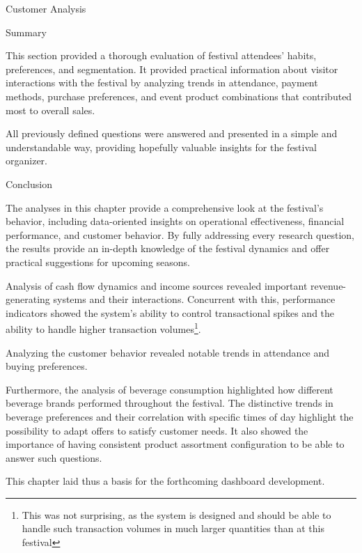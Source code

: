 \begin{section}{Customer Analysis}
	\begin{subsection}{Summary}
		\label{subsec:analysis-customer-summary}

		This section provided a thorough evaluation of festival attendees' habits, preferences, and segmentation.
		It provided practical information about visitor interactions with the festival by analyzing trends in attendance, payment methods, purchase preferences, and event product combinations that contributed most to overall sales.

		All previously defined questions were answered and presented in a simple and understandable way, providing hopefully valuable insights for the festival organizer.
	\end{subsection}
\end{section}

\begin{section}{Conclusion}
	\label{sec:analysis-conclusion}

	The analyses in this chapter provide a comprehensive look at the festival's behavior, including data-oriented insights on operational effectiveness, financial performance, and customer behavior.
	By fully addressing every research question, the results provide an in-depth knowledge of the festival dynamics and offer practical suggestions for upcoming seasons.

	Analysis of cash flow dynamics and income sources revealed important revenue-generating systems and their interactions.
	Concurrent with this, performance indicators showed the system's ability to control transactional spikes and the ability to handle higher transaction
	volumes\footnote{This was not surprising, as the system is designed and should be able to handle such transaction volumes in much larger quantities than at this festival}.

	Analyzing the customer behavior revealed notable trends in attendance and buying preferences.

	Furthermore, the analysis of beverage consumption highlighted how different beverage brands performed throughout the festival.
	The distinctive trends in beverage preferences and their correlation with specific times of day highlight the possibility to adapt offers to satisfy customer needs.
	It also showed the importance of having consistent product assortment configuration to be able to answer such questions.

	This chapter laid thus a basis for the forthcoming dashboard development.
\end{section}
